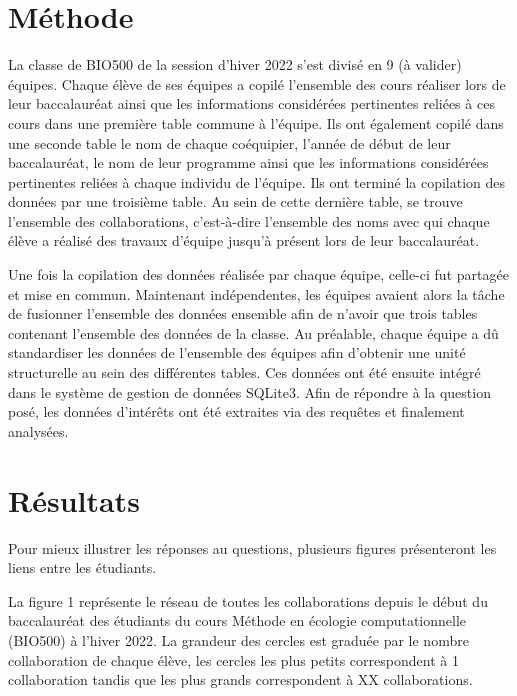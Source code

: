 \documentclass[9pt,twocolumn,twoside,]{pnas-new}
\begin{document}
\hypertarget{muxe9thode}{%
\section{Méthode}\label{muxe9thode}}

La classe de BIO500 de la session d'hiver 2022 s'est divisé en 9 (à
valider) équipes. Chaque élève de ses équipes a copilé l'ensemble des
cours réaliser lors de leur baccalauréat ainsi que les informations
considérées pertinentes reliées à ces cours dans une première table
commune à l'équipe. Ils ont également copilé dans une seconde table le
nom de chaque coéquipier, l'année de début de leur baccalauréat, le nom
de leur programme ainsi que les informations considérées pertinentes
reliées à chaque individu de l'équipe. Ils ont terminé la copilation des
données par une troisième table. Au sein de cette dernière table, se
trouve l'ensemble des collaborations, c'est-à-dire l'ensemble des noms
avec qui chaque élève a réalisé des travaux d'équipe jusqu'à présent
lors de leur baccalauréat.

Une fois la copilation des données réalisée par chaque équipe, celle-ci
fut partagée et mise en commun. Maintenant indépendentes, les équipes
avaient alors la tâche de fusionner l'ensemble des données ensemble afin
de n'avoir que trois tables contenant l'ensemble des données de la
classe. Au préalable, chaque équipe a dû standardiser les données de
l'ensemble des équipes afin d'obtenir une unité structurelle au sein des
différentes tables. Ces données ont été ensuite intégré dans le système
de gestion de données SQLite3. Afin de répondre à la question posé, les
données d'intérêts ont été extraites via des requêtes et finalement
analysées.

\hypertarget{ruxe9sultats}{%
\section{Résultats}\label{ruxe9sultats}}

Pour mieux illustrer les réponses au questions, plusieurs figures
présenteront les liens entre les étudiants.

La figure 1 représente le réseau de toutes les collaborations depuis le
début du baccalauréat des étudiants du cours Méthode en écologie
computationnelle (BIO500) à l'hiver 2022. La grandeur des cercles est
graduée par le nombre collaboration de chaque élève, les cercles les
plus petits correspondent à 1 collaboration tandis que les plus grands
correspondent à XX collaborations.
\end{document}
